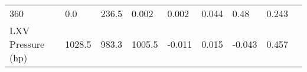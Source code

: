 \documentclass[11pt]{article}
\begin{document}
\begin{longtable}[]{@{}lllllllll@{}}
\begin{minipage}[t]{0.06\columnwidth}
360\strut
\end{minipage} & \begin{minipage}[t]{0.06\columnwidth}\raggedright\strut
0.0\strut
\end{minipage} & \begin{minipage}[t]{0.08\columnwidth}\raggedright\strut
236.5\strut
\end{minipage} & \begin{minipage}[t]{0.05\columnwidth}\raggedright\strut
0.002\strut
\end{minipage} & \begin{minipage}[t]{0.07\columnwidth}\raggedright\strut
0.002\strut
\end{minipage} & \begin{minipage}[t]{0.06\columnwidth}\raggedright\strut
0.044\strut
\end{minipage} & \begin{minipage}[t]{0.06\columnwidth}\raggedright\strut
0.48\strut
\end{minipage} & \begin{minipage}[t]{0.07\columnwidth}\raggedright\strut
0.243\strut
\end{minipage}\tabularnewline
\begin{minipage}[t]{0.25\columnwidth}\raggedright\strut
LXV Pressure (hp)\strut
\end{minipage} & \begin{minipage}[t]{0.06\columnwidth}\raggedright\strut
1028.5\strut
\end{minipage} & \begin{minipage}[t]{0.06\columnwidth}\raggedright\strut
983.3\strut
\end{minipage} & \begin{minipage}[t]{0.08\columnwidth}\raggedright\strut
1005.5\strut
\end{minipage} & \begin{minipage}[t]{0.05\columnwidth}\raggedright\strut
-0.011\strut
\end{minipage} & \begin{minipage}[t]{0.07\columnwidth}\raggedright\strut
0.015\strut
\end{minipage} & \begin{minipage}[t]{0.06\columnwidth}\raggedright\strut
-0.043\strut
\end{minipage} & \begin{minipage}[t]{0.06\columnwidth}\raggedright\strut
0.457\strut
\end{minipage} & \begin{minipage}[t]{0.07\columnwidth}\raggedright\strut

\end{minipage}
\end{longtable}
\end{document}
